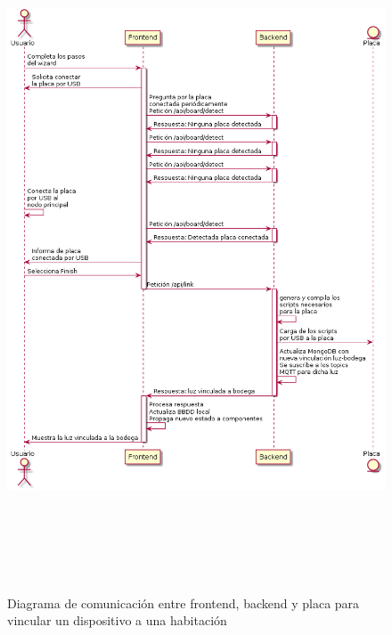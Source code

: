 \begin{figure}[hbt!]
\centering
\includegraphics[height=8in]{figures/diagrams/use-cases/linkRoom.png}
\caption[usecase1]{Diagrama de comunicación entre frontend, backend y placa para vincular un dispositivo a una habitación\footnotemark}
\label{fig:usecase1}
\end{figure}

